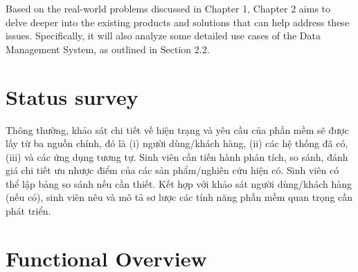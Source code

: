 \documentclass[../Main.tex]{subfiles}
\begin{document}
Based on the real-world problems discussed in Chapter 1, Chapter 2 aims to delve deeper into the existing products and solutions that can help address these issues. Specifically, it will also analyze some detailed use cases of the Data Management System, as outlined in Section 2.2.
\section{Status survey}
\label{section:2.1}
Thông thường, khảo sát chi tiết về hiện trạng và yêu cầu của phần mềm sẽ được lấy từ ba nguồn chính, đó là (i) người dùng/khách hàng, (ii) các hệ thống đã có, (iii) và các ứng dụng tương tự.
Sinh viên cần tiến hành phân tích, so sánh, đánh giá chi tiết ưu nhược điểm của các sản phẩm/nghiên cứu hiện có. Sinh viên có thể lập bảng so sánh nếu cần thiết. Kết hợp với khảo sát người dùng/khách hàng (nếu có), sinh viên nêu và mô tả sơ lược các tính năng phần mềm quan trọng cần phát triển.

\section{Functional Overview}
\label{section:2.2}
\end{document}
